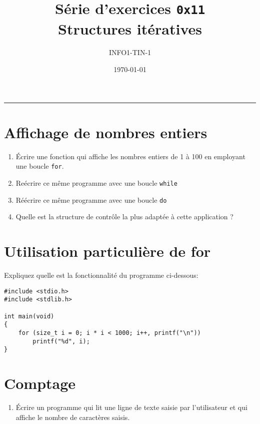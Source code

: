 



\date{\today}
\author{INFO1-TIN-1}
\title{Série d'exercices \texttt{0x11} \\ \textbf{Structures itératives}}
\maketitle

\noindent\rule{\textwidth}{.3pt}

\begin{multicols}{2}

\section{Affichage de nombres entiers}

\begin{enumerate}[label=(\roman*)]
    \item Écrire une fonction qui affiche les nombres entiers de 1 à 100 en employant une boucle \lstinline{for}.
    \item Reécrire ce même programme avec une boucle \lstinline{while}
    \item Réécrire ce même programme avec une boucle \lstinline{do}
    \item Quelle est la structure de contrôle la plus adaptée à cette application ?
\end{enumerate}

\section{Utilisation particulière de for}

Expliquez quelle est la fonctionnalité du programme ci-dessous:

\begin{lstlisting}
#include <stdio.h>
#include <stdlib.h>

int main(void)
{
    for (size_t i = 0; i * i < 1000; i++, printf("\n"))
        printf("%d", i);
}
\end{lstlisting}

\section{Comptage}

\begin{enumerate}[label=(\roman*)]
    \item Écrire un programme qui lit une ligne de texte saisie par l'utilisateur et qui affiche le nombre de caractères saisis.


\end{enumerate}
\end{multicols}
